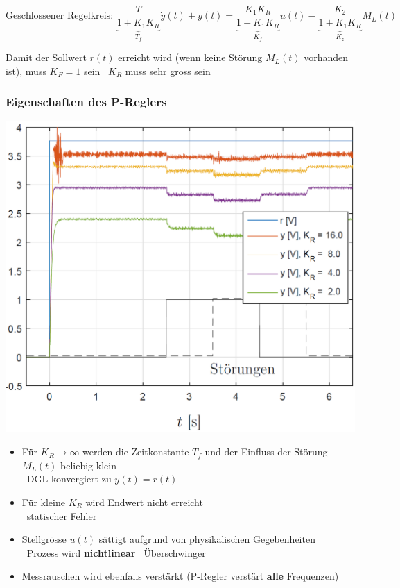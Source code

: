 $$ \boxed{ \text{Geschlossener Regelkreis: } \underbrace{\frac{T}{1 + K_1 K_R}}_{T_f} \dot{y}(t) + y(t) = \underbrace{\frac{K_1 K_R}{1 + K_1 K_R}}_{K_f} u(t)
    - \underbrace{\frac{K_2}{1 + K_1 K_R}}_{K_z} M_L(t) } $$

Damit der Sollwert $r(t)$ erreicht wird (wenn keine Störung $M_L(t)$ vorhanden ist), muss $K_F = 1$ sein
\textrightarrow\ $K_R$ muss sehr gross sein


\subsubsection{Eigenschaften des P-Reglers}


\begin{minipage}[c]{0.4\columnwidth}
    \includegraphics[width=\columnwidth]{images/gleichstromantrieb_p-regler_step-response.png}
\end{minipage}
\hfill
\begin{minipage}[c]{0.58\columnwidth}
    \begin{itemize}
        \item Für $K_R \to \infty$ werden die Zeitkonstante $T_f$ und der Einfluss der Störung $M_L(t)$ beliebig klein \\
            \textrightarrow\ DGL konvergiert zu $y(t) = r(t)$
        \item Für kleine $K_R$ wird Endwert nicht erreicht \\
            \textrightarrow\ statischer Fehler
        \item Stellgrösse $u(t)$ sättigt aufgrund von physikalischen Gegebenheiten \textrightarrow\ Prozess wird \textbf{nichtlinear}
            \textrightarrow\ Überschwinger
        \item Messrauschen wird ebenfalls verstärkt (P-Regler verstärt \textbf{alle} Frequenzen) 
    \end{itemize}
\end{minipage}

